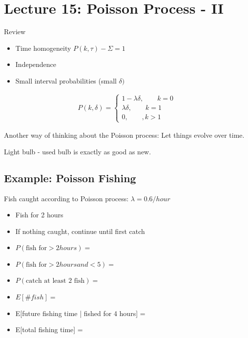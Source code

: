 \documentclass{article}
\begin{document}
\section{Lecture 15: Poisson Process - II}


Review 
\begin{itemize}
    \item Time homogeneity $P(k, \tau) - \Sigma = 1$
    \item Independence
    \item Small interval probabilities  (small $\delta)$
\end{itemize}

\begin{align*}
P(k,\delta)=
\begin{cases}
    1 - \lambda \delta, \qquad k=0\\
    \lambda \delta, \qquad k=1\\
    0, \qquad, k>1
\end{cases}    
\end{align*}

  Another way of thinking about the Poisson process: Let things evolve over time.

Light bulb - used bulb is exactly as good as new.

\subsection{Example: Poisson Fishing}


Fish caught according to Poisson process: $\lambda=0.6/hour$

\begin{itemize}
    \item Fish for 2 hours
    \item If nothing caught, continue until first catch
\end{itemize}

\begin{itemize}
    \item $P(\text{fish for} > 2hours) = $
    \item $P(\text{fish for} > 2hours and < 5) = $
    \item $P(\text{catch at least 2 fish}) = $
    \item $E[\# fish]=$
    \item E[future fishing time | fished for 4 hours] =
    \item E[total fishing time] = 
\end{itemize}
\end{document}
